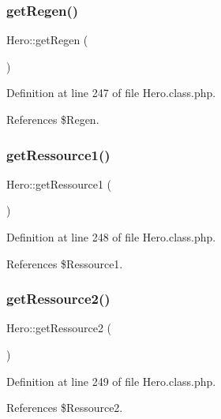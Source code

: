 \subsubsection{\texorpdfstring{get\+Regen()}{getRegen()}}
{\footnotesize\ttfamily Hero\+::get\+Regen (\begin{DoxyParamCaption}{ }\end{DoxyParamCaption})}



Definition at line 247 of file Hero.\+class.\+php.



References \$\+Regen.

\mbox{\label{class_hero_a245366660d4e206f98b4e013236d1ff0}} 
\subsubsection{\texorpdfstring{get\+Ressource1()}{getRessource1()}}
{\footnotesize\ttfamily Hero\+::get\+Ressource1 (\begin{DoxyParamCaption}{ }\end{DoxyParamCaption})}



Definition at line 248 of file Hero.\+class.\+php.



References \$\+Ressource1.

\mbox{\label{class_hero_a1a51d9f394b7a921fda8a2c235a6daa7}} 
\subsubsection{\texorpdfstring{get\+Ressource2()}{getRessource2()}}
{\footnotesize\ttfamily Hero\+::get\+Ressource2 (\begin{DoxyParamCaption}{ }\end{DoxyParamCaption})}



Definition at line 249 of file Hero.\+class.\+php.



References \$\+Ressource2.

\mbox{\label{class_hero_a4936f0034a02283187e82ce677e57690}} 
